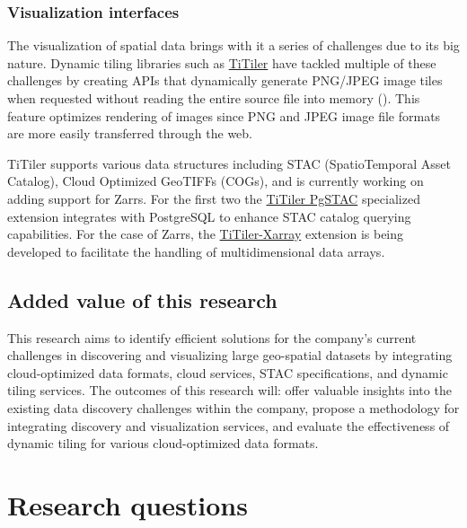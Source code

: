 \documentclass[
  oneside,
  open=any]{scrbook}
\begin{document}
\subsubsection*{Visualization
interfaces}\label{visualization-interfaces}

The visualization of spatial data brings with it a series of challenges
due to its big nature. Dynamic tiling libraries such as
\href{https://developmentseed.org/titiler/}{TiTiler} have tackled
multiple of these challenges by creating APIs that dynamically generate
PNG/JPEG image tiles when requested without reading the entire source
file into memory
(). This
feature optimizes rendering of images since PNG and JPEG image file
formats are more easily transferred through the web.

TiTiler supports various data structures including STAC (SpatioTemporal
Asset Catalog), Cloud Optimized GeoTIFFs (COGs), and is currently
working on adding support for Zarrs. For the first two the
\href{https://github.com/stac-utils/titiler-pgstac}{TiTiler PgSTAC}
specialized extension integrates with PostgreSQL to enhance STAC catalog
querying capabilities. For the case of Zarrs, the
\href{https://github.com/developmentseed/titiler-xarray}{TiTiler-Xarray}
extension is being developed to facilitate the handling of
multidimensional data arrays.

\subsection{Added value of this
research}\label{added-value-of-this-research}

This research aims to identify efficient solutions for the company's
current challenges in discovering and visualizing large geo-spatial
datasets by integrating cloud-optimized data formats, cloud services,
STAC specifications, and dynamic tiling services. The outcomes of this
research will: offer valuable insights into the existing data discovery
challenges within the company, propose a methodology for integrating
discovery and visualization services, and evaluate the effectiveness of
dynamic tiling for various cloud-optimized data formats.

\section{Research questions}\label{research-questions}
\end{document}
